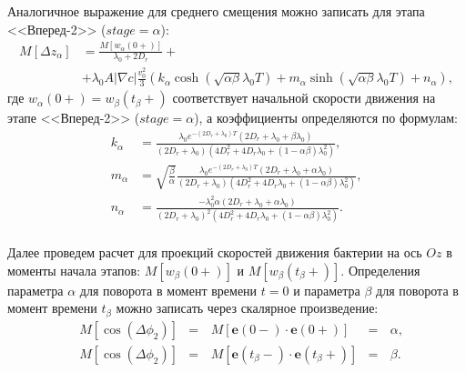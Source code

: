 Аналогичное выражение для среднего смещения можно записать для этапа <<Вперед-2>> ($stage=\alpha$):
\begin{equation}
    \begin{aligned}
        M\left [\Delta z_{\alpha} \right ]&=\frac{M\left [w_{\alpha}(0+) \right ]}{\lambda_0+2 D_r} +\\ &+ \lambda_0 A |\nabla c| \frac{v_0^2}{3} \left ( k_{\alpha} \cosh\left (\sqrt{\alpha \beta} \lambda_0 T \right ) + m_{\alpha} \sinh\left (\sqrt{\alpha \beta} \lambda_0 T \right ) + n_{\alpha} \right ),
        \label{eq:mdlrd-solution-alpha}
    \end{aligned}
\end{equation}
где $w_{\alpha}(0+)=w_{\beta}(t_{\beta}+)$ соответствует начальной скорости движения на этапе <<Вперед-2>> ($stage=\alpha$), а коэффициенты определяются по формулам:
\begin{equation}
    \begin{aligned}
        k_{\alpha}&=\frac{\lambda_0 e^{-(2D_r+\lambda_0)T} \left (2D_r+\lambda_0+\beta\lambda_0 \right )}{(2D_r+\lambda_0) \left (4D_r^2+4D_r\lambda_0+(1-\alpha\beta)\lambda_0^2 \right )}, \\
        m_{\alpha}&=\sqrt{\frac{\beta}{\alpha}}\frac{\lambda_0 e^{-(2D_r+\lambda_0)T} \left (2D_r+\lambda_0+\alpha\lambda_0 \right )}{(2D_r+\lambda_0) \left (4D_r^2+4D_r\lambda_0+(1-\alpha\beta)\lambda_0^2 \right )}, \\
        n_{\alpha}&=\frac{-\lambda_0^2 \alpha (2D_r+\lambda_0+\alpha\lambda_0)}{(2D_r+\lambda_0)^2 \left (4D_r^2+4D_r\lambda_0+(1-\alpha\beta)\lambda_0^2 \right )}. \\
        \label{eq:mdlrd-solution-alpha-coeffs}
    \end{aligned}
\end{equation}

Далее проведем расчет для проекций скоростей движения бактерии на ось $Oz$ в моменты начала этапов: $M\left [w_{\beta}(0+) \right ]$ и $M\left [w_{\beta}(t_{\beta}+) \right ]$. Определения параметра $\alpha$ для поворота в момент времени $t=0$ и параметра $\beta$ для поворота в момент времени $t_{\beta}$ можно записать через скалярное произведение:
\begin{equation}
    \begin{aligned}
        &M \left [\cos (\Delta\phi_2) \right ]&=&\,M\left [\textbf{e}(0-) \cdot \textbf{e}(0+) \right ]&=&\,\alpha, \\
        &M\left [\cos (\Delta\phi_2) \right ]&=&\,M\left [\textbf{e}(t_{\beta}-) \cdot \textbf{e}(t_{\beta}+) \right ]&=&\,\beta. \\
        \label{eq:alpha-beta-definition}
    \end{aligned}
\end{equation}


